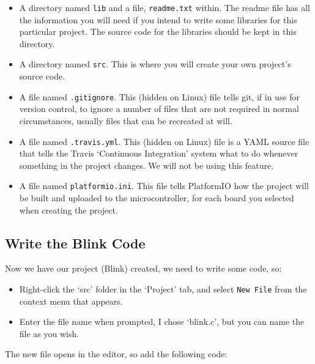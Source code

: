 \begin{itemize}
\item
  A directory named \lstinline!lib! and a file, \lstinline!readme.txt! within.
  The readme file has all the information you will need if you intend to
  write some libraries for this particular project. The source code for
  the libraries should be kept in this directory.
\item
  A directory named \lstinline!src!. This is where you will create your own
  project's source code.
\item
  A file named \lstinline!.gitignore!. This (hidden on Linux) file tells git, if in use for
  version control, to ignore a number of files that are not required in
  normal circumstances, usually files that can be recreated at will.
\item
  A file named \lstinline!.travis.yml!. This (hidden on Linux) file is a YAML source file that
  tells the Travis `Continuous Integration' system what to do whenever
  something in the project changes. We will not be using this feature.
\item
  A file named \lstinline!platformio.ini!. This file tells PlatformIO how the
  project will be built and uploaded to the microcontroller, for each
  board you selected when creating the project.
\end{itemize}

\subsection{Write the Blink Code}\label{write-the-blink-code}

Now we have our project (Blink) created, we need to write some code, so:

\begin{itemize}
\item
  Right-click the `src' folder in the `Project' tab, and select
  \lstinline!New File! from the context menu that appears.
\item
  Enter the file name when prompted, I chose `blink.c', but you can name
  the file as you wish.
\end{itemize}

The new file opens in the editor, so add the following code:

